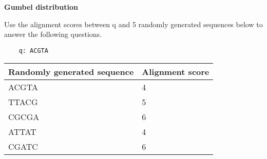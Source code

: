 \question \textbf{Gumbel distribution}
  
Use the alignment scores between q and 5 randomly generated sequences below to answer the following questions.

\begin{verbatim}
    q: ACGTA
\end{verbatim}

\begin{table}[H]
\centering
\begin{tabular}{|l|l|}
\hline
Randomly generated sequence & Alignment score \\ \hline
ACGTA                       & 4               \\ \hline
TTACG                       & 5               \\ \hline
CGCGA                       & 6               \\ \hline
ATTAT                       & 4               \\ \hline
CGATC                       & 6               \\ \hline
\end{tabular}
\end{table}

\vspace{0.1 in}

